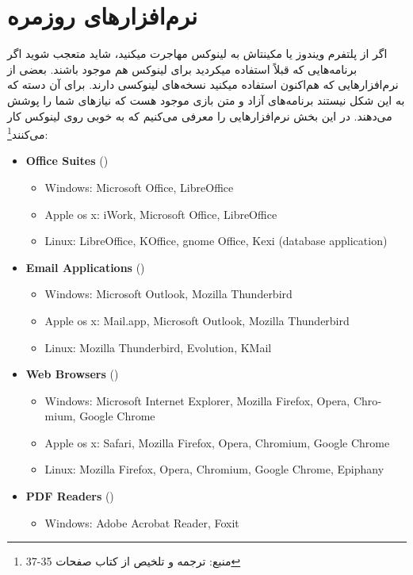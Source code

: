 \section{نرم‌افزارهای روزمره}
اگر از پلتفرم ویندوز یا مکینتاش به لینوکس مهاجرت میکنید، شاید متعجب شوید اگر برنامه‌هایی که قبلاً استفاده میکردید برای لینوکس هم موجود باشند. بعضی از نرم‌افزارهایی که هم‌اکنون استفاده میکنید نسخه‌های لینوکسی دارند. برای آن دسته که به این شکل نیستند برنامه‌های آزاد و متن بازی موجود هست که نیازهای شما را پوشش می‌دهند. در این بخش نرم‌افزارهایی را معرفی می‌کنیم که به خوبی روی لینوکس کار می‌کنند\footnote{
	منبع:
	ترجمه و تلخیص از کتاب
	صفحات 35-37
}:
\begin{latin}
	\begin{itemize}
		\item \textbf{Office Suites} ()
		\begin{itemize}
			\item Windows: Microsoft Office, LibreOffice
			\item Apple os x: iWork, Microsoft Office, LibreOffice
			\item Linux: LibreOffice, KOffice, gnome Office, Kexi (database application)
		\end{itemize}
		\item \textbf{Email Applications} ()
		\begin{itemize}
			\item Windows: Microsoft Outlook, Mozilla Thunderbird
			\item Apple os x: Mail.app, Microsoft Outlook, Mozilla Thunderbird
			\item Linux: Mozilla Thunderbird, Evolution, KMail
		\end{itemize}
		\item \textbf{Web Browsers} ()
		\begin{itemize}
			\item Windows: Microsoft Internet Explorer, Mozilla Firefox, Opera, Chromium, Google Chrome
			\item Apple os x: Safari, Mozilla Firefox, Opera, Chromium, Google Chrome
			\item Linux: Mozilla Firefox, Opera, Chromium, Google Chrome, Epiphany
		\end{itemize}
		\item \textbf{PDF Readers} ()
		\begin{itemize}
			\item Windows: Adobe Acrobat Reader, Foxit

\end{itemize}
\end{itemize}
\end{latin}

